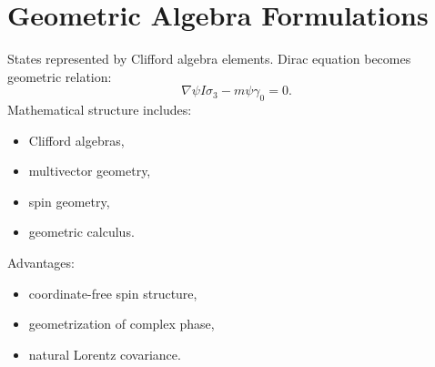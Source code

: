 \section{Geometric Algebra Formulations}
\label{qmf:ga}
States represented by Clifford algebra elements.
Dirac equation becomes geometric relation:
\[\nabla \psi I\sigma_3-m\psi\gamma_0=0.\]
Mathematical structure includes:
\begin{itemize}
\item Clifford algebras,
\item multivector geometry,
\item spin geometry,
\item geometric calculus.
\end{itemize}
Advantages:
\begin{itemize}
\item coordinate-free spin structure,
\item geometrization of complex phase,
\item natural Lorentz covariance.
\end{itemize}


